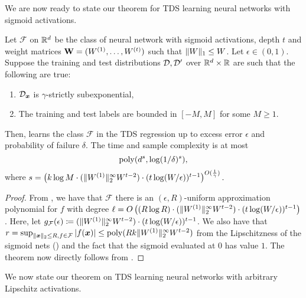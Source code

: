 We are now ready to state our theorem for TDS learning neural networks with sigmoid activations.
\begin{theorem}
\label{thm:tds_learning_sigmoid_subexp_appendix}
Let $\mathcal{F}$ on $\mathbb{R}^{d}$ be the class of  neural network with sigmoid activations, depth $t$ and weight matrices $\mathbf{W}=(W^{(1)},\ldots,W^{(t)})$ such that $\|W\|_1\leq W$.  Let $\epsilon\in (0,1)$. Suppose the training and test distributions ${\mathcal{D}},{\mathcal{D}}'$ over $\mathbb{R}^{d}\times \mathbb{R}$ are such that the following are true:
\begin{enumerate}
    \item ${\mathcal{D}}_{{\bm{x}}}$ is $\gamma$-strictly subexponential,
    \item The training and test labels are bounded in $[-M,M]$ for some $M\geq 1$.
\end{enumerate}
Then,  learns the class $\mathcal{F}$ in the TDS regression up to excess error $\epsilon$ and probability of failure $\delta$. The time and sample complexity is at most \[\mathrm{poly}(d^{s},\log(1/\delta)^s),\] where $s=\left(k\log M\cdot (\|W^{(1)}\|_{2}^{\infty}W^{t-2})\cdot (t\log(W/\epsilon))^{t-1}\right)^{O(\frac{1}{\gamma})}.$
\end{theorem}
\begin{proof}
From , we have that $\mathcal{F}$ there is an $(\epsilon, R)$-uniform approximation polynomial for $f$ with degree $\ell=O\left((R\log R)\cdot (\|W^{(1)}\|_{2}^{\infty}W^{t-2})\cdot (t\log(W/\epsilon))^{t-1}\right)$. Here, let $g_{\mathcal{F}}(\epsilon)\coloneq  (\|W^{(1)}\|_{2}^{\infty}W^{t-2})\cdot (t\log(W/\epsilon))^{t-1}$. We also have that $r=\sup_{\|{\bm{x}}\|_{2}\leq R,f\in \mathcal{F}}|f({\bm{x}})|\leq \mathrm{poly}(Rk\|W^{(1)}\|_{2}^{\infty}W^{t-2})$ from the Lipschitzness of the sigmoid nets () and the fact that the sigmoid evaluated at $0$ has value $1$. The theorem now directly follows from .
\end{proof}

We now state our theorem on TDS learning neural networks with arbitrary Lipschitz activations.


